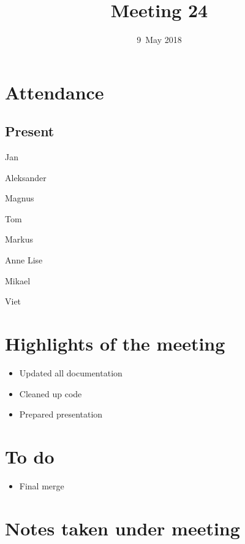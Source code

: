 \documentclass[letterpaper,11pt]{article}
\title{Meeting 24}
\date{9~May 2018}
\begin{document}
\maketitle
\section*{Attendance}
\subsection*{Present}
\begin{list}{}{}
	\item Jan
	\item Aleksander
	\item Magnus
	\item Tom
	\item Markus
	\item Anne Lise
	\item Mikael
	\item Viet
\end{list}

\newpage
\section*{Highlights of the meeting}
\begin{itemize}
	\item Updated all documentation
	\item Cleaned up code
	\item Prepared presentation
\end{itemize}

\section*{To do}
\begin{itemize}
	\item Final merge
\end{itemize}

\section*{Notes taken under meeting}
\end{document}
